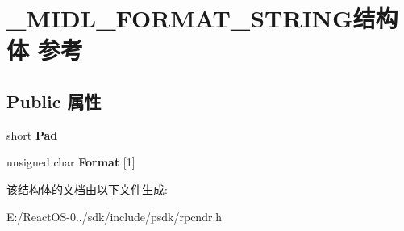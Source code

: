 \hypertarget{struct___m_i_d_l___f_o_r_m_a_t___s_t_r_i_n_g}{}\section{\+\_\+\+M\+I\+D\+L\+\_\+\+F\+O\+R\+M\+A\+T\+\_\+\+S\+T\+R\+I\+N\+G结构体 参考}
\label{struct___m_i_d_l___f_o_r_m_a_t___s_t_r_i_n_g}
\subsection*{Public 属性}
\begin{DoxyCompactItemize}
\item 
\mbox{\label{struct___m_i_d_l___f_o_r_m_a_t___s_t_r_i_n_g_abdf30d95bc67c09e0494fa8f1d244485}} 
short {\bfseries Pad}
\item 
\mbox{\label{struct___m_i_d_l___f_o_r_m_a_t___s_t_r_i_n_g_ab9b2a0c22f00c03b5ecb0534979c0790}} 
unsigned char {\bfseries Format} \mbox{[}1\mbox{]}
\end{DoxyCompactItemize}


该结构体的文档由以下文件生成\+:\begin{DoxyCompactItemize}
\item 
E\+:/\+React\+O\+S-\/0../sdk/include/psdk/rpcndr.\+h\end{DoxyCompactItemize}
